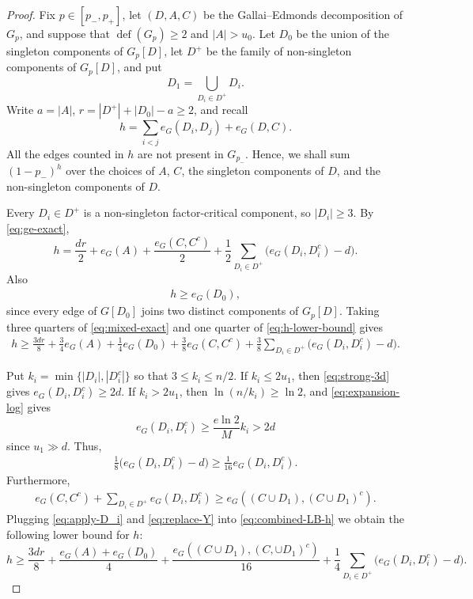 \documentclass[10pt,a4paper]{amsart}
\newcommand{\defi}{\operatorname{def}}
\begin{document}
\begin{proof}
Fix $p\in[p_-,p_+]$, let $(D,A,C)$ be the Gallai--Edmonds decomposition of $G_p$, and suppose that $\defi(G_p)\ge2$ and $|A|>u_0$.
Let $D_0$ be the union of the singleton components of $G_p[D]$, let $D^+$ be the family of non-singleton components of $G_p[D]$, and put
\[
 D_1=\bigcup_{D_i \in D^+} D_i.
\]
Write $a=|A|$, $r=|D^+|+|D_0|-a\ge2$, and recall
\[
 h=\sum_{i<j}e_G(D_i,D_j)+e_G(D,C).
\]
All the edges counted in $h$ are not present in $G_{p_-}$.
Hence, we shall sum $(1-p_-)^h$ over the choices of $A$, $C$, the singleton components of $D$, and the non-singleton components of $D$.

Every $D_i\in D^+$ is a non-singleton factor-critical component, so $|D_i|\ge3$.
By \eqref{eq:ge-exact},
\begin{equation}\label{eq:mixed-exact}
 h=\frac{dr}{2}+e_G(A)+\frac{e_G(C, C^c)}{2}
   +\frac{1}{2}\sum_{D_i\in D^+}\bigl(e_G(D_i, D_i^c)-d\bigr).
\end{equation}
Also 
\begin{align} \label{eq:h-lower-bound}
    h\ge e_G(D_0),
\end{align}
since every edge of $G[D_0]$ joins two distinct components of $G_p[D]$.
Taking three quarters of \eqref{eq:mixed-exact} and one quarter of \eqref{eq:h-lower-bound} gives
\begin{align} \label{eq:combined-LB-h}
     h\ge\frac{3dr}{8}+\frac34e_G(A)+\frac14e_G(D_0)  +\frac38 e_G(C, C^c)
 +\frac38\sum_{D_i\in D^+}\bigl(e_G(D_i, D_i^c)-d\bigr).
\end{align}

Put $k_i=\min\{|D_i|,|D_i^c|\}$ so that $3\le k_i\le n/2$.
If $k_i\le2u_1$, then \eqref{eq:strong-3d} gives $e_G(D_i, D_i^c)\ge2d$.
If $k_i>2u_1$, then $\ln(n/k_i)\ge\ln 2$, and \eqref{eq:expansion-log} gives
\[
 e_G(D_i, D_i^c)\ge\frac{e\ln 2}{M}k_i>2d
\]
since $u_1\gg d$. Thus,
\begin{align} \label{eq:apply-D_i}
    \frac18\bigl(e_G(D_i, D_i^c)-d\bigr)\ge\frac1{16}e_G(D_i, D_i^c).
\end{align}
Furthermore, 
 \begin{align} \label{eq:replace-Y}
     e_G(C, C^c)+\sum_{D_i\in D^+}e_G(D_i, D_i^c) \geq e_G((C \cup D_1), (C \cup D_1)^c).
 \end{align}
Plugging \eqref{eq:apply-D_i} and \eqref{eq:replace-Y} into \eqref{eq:combined-LB-h} we obtain the following lower bound for $h$:
\begin{equation}\label{eq:mixed-master}
 h\ge\frac{3dr}{8}
 +\frac{e_G(A)+e_G(D_0)}4
 +\frac{e_G((C \cup D_1), (C, \cup D_1)^c)}{16}
 +\frac14\sum_{D_i \in D^+}\bigl(e_G(D_i, D_i^c)-d\bigr).
\end{equation}


\end{proof}
\end{document}
